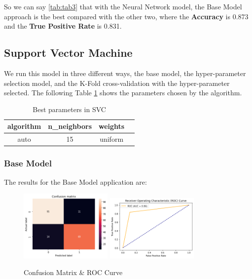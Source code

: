 \documentclass[conference]{IEEEtran}
\begin{document}
So we can say \ref{tab:tab3} that with the Neural Network model, the Base Model approach is the best compared with the other two, where the \textbf{Accuracy} is 0.873 and the \textbf{True Positive Rate} is 0.831.


\subsection{Support Vector Machine}

We run this model in three different ways, the base model, the hyper-parameter selection model, and the K-Fold cross-validation with the hyper-parameter selected. The following Table \ref{tab:tab-svc} shows the parameters chosen by the algorithm.

\begin{table}[h!]
    \centering
    \caption{Best parameters in SVC} 
    \begin{tabular}{||c c c c||} 
     \hline
     algorithm & n_neighbors & weights \\[0.5ex] 
     \hline\hline
     auto & 15 & uniform \\ 
    \hline
    \end{tabular}
    \label{tab:tab-svc}
\end{table}

\subsubsection{Base Model}
The results for the Base Model application are:

\begin{figure}[h!]
    \includegraphics[width=4.5cm]{SVC/svc1_1.png}%
    \includegraphics[width=4.5cm]{SVC/svc1_2.png}%
    \caption{Confusion Matrix & ROC Curve}%
    \label{fig:conf_SVC_1}%
\end{figure}
\end{document}
